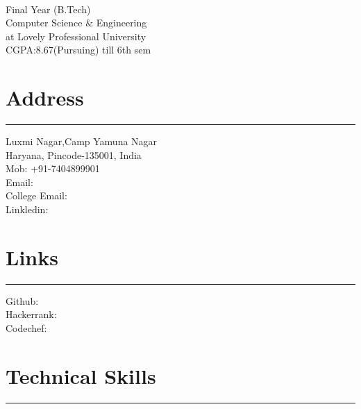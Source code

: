 \documentclass[]{vishal-kathpalia}
\begin{document}
%
%

\begin{minipage}[t]{0.33\textwidth} 
\begin{large}
	\\
\end{large}
Final Year (B.Tech)\\
Computer Science $\&$  Engineering\\ 
at Lovely Professional University \\ 
CGPA:8.67(Pursuing) till 6th sem 
\section{Address}
\noindent\rule{5cm}{0.4pt}

Luxmi Nagar,Camp Yamuna Nagar \\
Haryana, Pincode-135001, India \\
Mob: +91-7404899901 \\
Email: \textbf{\href{mailto:vishalkathpalia99@gmail.com}{}} \\
College Email: \textbf{\href{mailto:vishal.11808850@lpu.in}{}} \\
Linkledin: \textbf{\href{https://www.linkedin.com/in/vishal-kathpalia-ervk01}{}} 
\sectionsep
\section{Links} 
\noindent\rule{5cm}{0.4pt}

Github: \href{https://github.com/Er-Vishal-Kathpalia}{}\\
Hackerrank: \href{https://www.hackerrank.com/er_kathpalia}{}\\
Codechef: \href{https://www.codechef.com/users/er_kathpalia}{} 
\section{Technical Skills}
\noindent\rule{5cm}{0.4pt}

\end{minipage}
\end{document}
